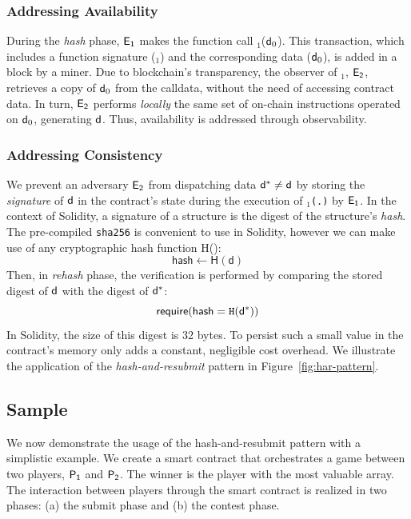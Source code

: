 \subsubsection{Addressing Availability} During the \emph{hash} phase,
$\mathsf{E_{1}}$ makes the function call \texttt{\proc}$_1$($\mathsf{d}_0$). This
transaction, which includes a function signature (\texttt{\proc$_1$}) and the
corresponding data ($\mathsf{d}_0$), is added in a block by a miner. Due to
blockchain's transparency, the observer of \texttt{\proc}$_1$, $\mathsf{E_{2}}$,
retrieves a copy of $\mathsf{d}_0$ from the calldata, without the need of accessing contract data. In
turn, $\mathsf{E_{2}}$ performs \emph{locally} the same set of on-chain instructions
operated on $\mathsf{d}_0$, generating $\mathsf{d}$. Thus, availability is addressed
through observability.

\subsubsection{Addressing Consistency} We prevent an adversary $\mathsf{E_{2}}$
from dispatching data $\mathsf{d^*}\neq\mathsf{d}$ by storing the \emph{signature} of
$\mathsf{d}$ in the contract's state during the execution of \texttt{\proc$_1$(.)} by
$\mathsf{E_{1}}$. In the context of Solidity, a signature of a structure is the
digest of the structure's \emph{hash}. The pre-compiled \texttt{sha256} is
convenient to use in Solidity, however we can make use of any cryptographic
hash function \textsf{H()}: \[\textsf{hash} \gets \textsf{H}(\textsf{d})\]
Then, in \emph{rehash} phase, the verification is performed by comparing the
stored digest of $\mathsf{d}$ with the digest of $\mathsf{d^*}$:
\[\textsf{require}(\textsf{hash} = \texttt{H}(\mathsf{d^*}))\] \noindent In Solidity,
the size of this digest is 32 bytes. To persist such a small value in the
contract's memory only adds a constant, negligible cost overhead. We illustrate
the application of the \emph{hash-and-resubmit} pattern in
Figure~\ref{fig:har-pattern}.

\subsection{Sample} We now demonstrate the usage of the
hash-and-resubmit pattern with a simplistic example. We create a smart contract
that orchestrates a game between two players, $\mathsf{P_1}$ and $\mathsf{P_2}$. The winner is
the player with the most valuable array. The interaction between players
through the smart contract is realized in two phases: (a) the submit phase and
(b) the contest phase.

